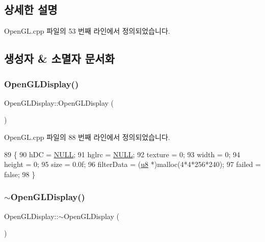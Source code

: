 \subsection{상세한 설명}


Open\+G\+L.\+cpp 파일의 53 번째 라인에서 정의되었습니다.



\subsection{생성자 \& 소멸자 문서화}
\mbox{\label{class_open_g_l_display_a0f3b7bf3f93a98c5726cbe2797fc595b}} 
\subsubsection{\texorpdfstring{Open\+G\+L\+Display()}{OpenGLDisplay()}}
{\footnotesize\ttfamily Open\+G\+L\+Display\+::\+Open\+G\+L\+Display (\begin{DoxyParamCaption}{ }\end{DoxyParamCaption})}



Open\+G\+L.\+cpp 파일의 88 번째 라인에서 정의되었습니다.


\begin{DoxyCode}
89 \{
90     hDC = \mbox{\hyperlink{getopt1_8c_a070d2ce7b6bb7e5c05602aa8c308d0c4}{NULL}};
91     hglrc = \mbox{\hyperlink{getopt1_8c_a070d2ce7b6bb7e5c05602aa8c308d0c4}{NULL}};
92     texture = 0;
93     width = 0;
94     height = 0;
95     size = 0.0f;
96     filterData = (\mbox{\hyperlink{_system_8h_aed742c436da53c1080638ce6ef7d13de}{u8}} *)malloc(4*4*256*240);
97     failed = \textcolor{keyword}{false};
98 \}
\end{DoxyCode}
\mbox{\label{class_open_g_l_display_ac628237ab5084bd4f74178b69fb51088}} 
\subsubsection{\texorpdfstring{$\sim$\+Open\+G\+L\+Display()}{~OpenGLDisplay()}}
{\footnotesize\ttfamily Open\+G\+L\+Display\+::$\sim$\+Open\+G\+L\+Display (\begin{DoxyParamCaption}{ }\end{DoxyParamCaption})\hspace{0.3cm}{\ttfamily [virtual]}}



